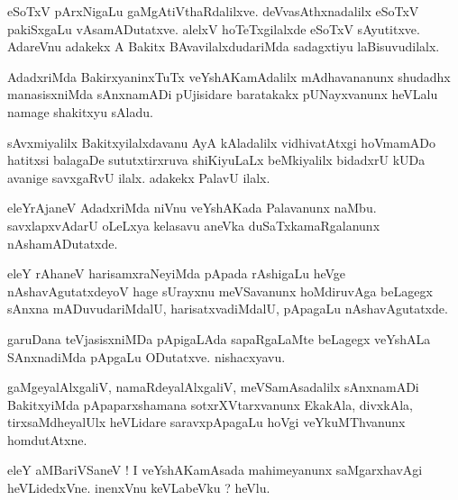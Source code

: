 \documentclass{article}
\begin{document}
\begin{mn}%
eSoTxV pArxNigaLu gaMgAtiVthaRdalilxve. deVvasAthxnadalilx eSoTxV pakiSxgaLu 
vAsamADutatxve. alelxV hoTeTxgilalxde eSoTxV sAyutitxve. AdareVnu adakekx A Bakitx 
BAvavilalxdudariMda sadagxtiyu laBisuvudilalx.
\end{mn}

\begin{mn}%
AdadxriMda BakirxyaninxTuTx veYshAKamAdalilx mAdhavananunx shudadhx manasisxniMda 
sAnxnamADi pUjisidare baratakakx pUNayxvanunx heVLalu namage shakitxyu sAladu.
\end{mn}

\begin{mn}%
sAvxmiyalilx Bakitxyilalxdavanu AyA kAladalilx vidhivatAtxgi hoVmamADo hatitxsi balagaDe 
sututxtirxruva shiKiyuLaLx beMkiyalilx bidadxrU kUDa avanige savxgaRvU ilalx. adakekx 
PalavU ilalx.
\end{mn}

\begin{mn}%
eleYrAjaneV AdadxriMda niVnu veYshAKada Palavanunx naMbu. savxlapxvAdarU oLeLxya kelasavu 
aneVka duSaTxkamaRgalanunx nAshamADutatxde.
\end{mn}

\begin{mn}%
eleY rAhaneV harisamxraNeyiMda pApada rAshigaLu heVge nAshavAgutatxdeyoV hage sUrayxnu 
meVSavanunx hoMdiruvAga beLagegx sAnxna mADuvudariMdalU, harisatxvadiMdalU, pApagaLu 
nAshavAgutatxde.
\end{mn}

\begin{mn}%
garuDana teVjasisxniMDa pApigaLAda sapaRgaLaMte beLagegx veYshALa SAnxnadiMda pApgaLu 
ODutatxve. nishacxyavu.
\end{mn}

\begin{mn}%
gaMgeyalAlxgaliV, namaRdeyalAlxgaliV, meVSamAsadalilx sAnxnamADi BakitxyiMda 
pApaparxshamana sotxrXVtarxvanunx EkakAla, divxkAla, tirxsaMdheyalUlx heVLidare 
saravxpApagaLu hoVgi veYkuMThvanunx homdutAtxne.
\end{mn}

\begin{mn}%
eleY aMBariVSaneV ! I veYshAKamAsada mahimeyanunx saMgarxhavAgi heVLidedxVne. inenxVnu 
keVLabeVku ? heVlu.
\end{mn}

\end{document}
